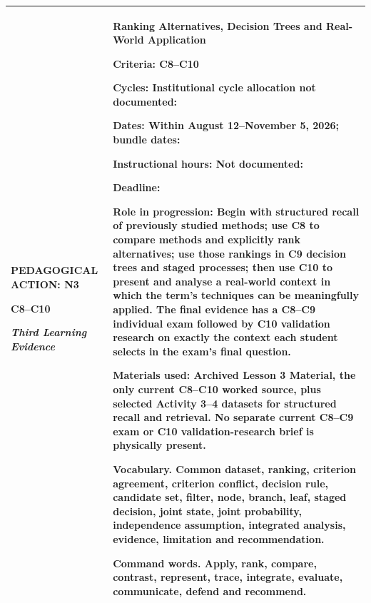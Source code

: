 \documentclass[10pt,letterpaper]{article}
\newcommand{\labelled}[2]{\textbf{#1:} #2\par}
\begin{document}
	\vspace{0.18in}
	
	\noindent
	\begin{tabularx}{\textwidth}{|>{\RaggedRight\arraybackslash}p{2.42in}|>{\RaggedRight\arraybackslash}X|}
		\hline
		\textbf{PEDAGOGICAL ACTION: N3}\par
		\textbf{C8--C10}\par
		\textit{Third Learning Evidence}
		&
		\textbf{Ranking Alternatives, Decision Trees and Real-World Application}\par
		\vspace{2pt}
		\fontsize{8.15}{10.25}\selectfont
		\labelled{Criteria}{C8--C10}
		\labelled{Cycles}{Institutional cycle allocation not documented: \underline{\hspace{2.2in}}}
		\labelled{Dates}{Within August 12--November 5, 2026; bundle dates: \underline{\hspace{2.1in}}}
		\labelled{Instructional hours}{Not documented: \underline{\hspace{1.6in}}}
		\labelled{Deadline}{\underline{\hspace{3in}}}
		\labelled{Role in progression}{Begin with structured recall of previously studied methods; use C8 to compare methods and explicitly rank alternatives; use those rankings in C9 decision trees and staged processes; then use C10 to present and analyse a real-world context in which the term's techniques can be meaningfully applied. The final evidence has a C8--C9 individual exam followed by C10 validation research on exactly the context each student selects in the exam's final question.}
		\labelled{Materials used}{Archived Lesson 3 Material, the only current C8--C10 worked source, plus selected Activity 3--4 datasets for structured recall and retrieval. No separate current C8--C9 exam or C10 validation-research brief is physically present.}
		
		\textbf{Vocabulary.} Common dataset, ranking, criterion agreement,
		criterion conflict, decision rule, candidate set, filter, node, branch, leaf,
		staged decision, joint state, joint probability, independence assumption,
		integrated analysis, evidence, limitation and recommendation.
		
		\textbf{Command words.} Apply, rank, compare, contrast, represent, trace,
		integrate, evaluate, communicate, defend and recommend.
		\\
		\hline
	\end{tabularx}
	
\end{document}
